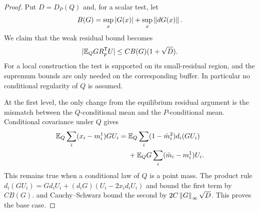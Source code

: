 \begin{proof}
Put $D=D_P(Q)$ and, for a scalar test, let
\[
 B(G)=\sup_x|G(x)|+\sup_x\left\lVert dG(x)\right\rVert.
\]
We claim that the weak residual bound becomes
\begin{equation}\label{eq:stat-Q-residual}
 |\mathbb E_Q G R_p^{\mathsf T}U|
       \le C B(G)(1+\sqrt D).
\end{equation}
For a local construction the test is supported on its small-residual
region, and the supremum bounds are only needed on the corresponding
buffer.  In particular no conditional regularity of $Q$ is assumed.

At the first level, the only change from the equilibrium residual
argument is the mismatch between the $Q$-conditional mean and the
$P$-conditional mean.  Conditional covariance under $Q$ gives
\begin{align*}
 \mathbb E_Q\sum_i(x_i-m_i^1)GU_i
 ={}&\mathbb E_Q\sum_i(1-\bar m_i^2)d_i(GU_i)\\
 &+\mathbb E_Q G\sum_i(\bar m_i-m_i^1)U_i.
\end{align*}
This remains true when a conditional law of $Q$ is a point mass.  The
product rule $d_i(GU_i)=Gd_iU_i+(d_iG)(U_i-2x_id_iU_i)$ and
 bound the first term by $CB(G)$.
 and Cauchy--Schwarz bound the second by
$2C\left\lVert G\right\rVert_\infty\sqrt D$.  This proves the base case.


\end{proof}
